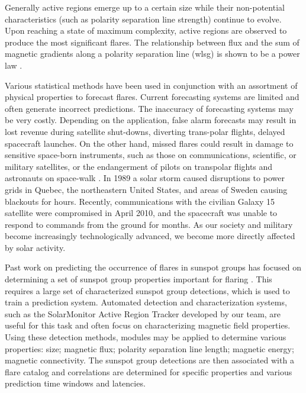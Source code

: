 Generally active regions emerge up to a certain size while their non-potential characteristics (such as polarity separation line strength) continue to evolve. Upon reaching a state of maximum complexity, active regions are observed to produce the most significant flares. The relationship between flux and the sum of magnetic gradients along a polarity separation line (\gls{wlsg}) is shown to be a power law \citep{Falconer:2009}. 

Various statistical methods have been used in conjunction with an assortment of physical properties to forecast flares. %
Current forecasting systems are limited \citep{Messerotti:2009} and often generate incorrect predictions. The inaccuracy of forecasting systems may be very costly. Depending on the application, false alarm forecasts may result in lost revenue during satellite shut-downs, diverting trans-polar flights, delayed spacecraft launches. On the other hand, missed flares could result in damage to sensitive space-born instruments, such as those on communications, scientific, or military satellites, or the endangerment of pilots on transpolar flights and astronauts on space-walk \citep{national2008Severe}. In 1989 a solar storm caused disruptions to power grids in Quebec, the northeastern United States, and areas of Sweden causing blackouts for hours. Recently, communications with the civilian Galaxy 15 satellite were compromised in April 2010, and the spacecraft was unable to respond to commands from the ground for months. As our society and military become increasingly technologically advanced, we become more directly affected by solar activity.

Past work on predicting the occurrence of flares in sunspot groups has focused on determining a set of sunspot group properties important for flaring \citep{Gallagher:2002}. This requires a large set of characterized sunspot group detections, which is used to train a prediction system. Automated detection and characterization systems, such as the SolarMonitor Active Region Tracker \citep[SMART;][]{higgins:2011} developed by our team, are useful for this task and often focus on characterizing magnetic field properties. Using these detection methods, modules may be applied to determine various properties: size; magnetic flux; polarity separation line length; magnetic energy; magnetic connectivity. The sunspot group detections are then associated with a flare catalog and correlations are determined for specific properties and various prediction time windows and latencies.

